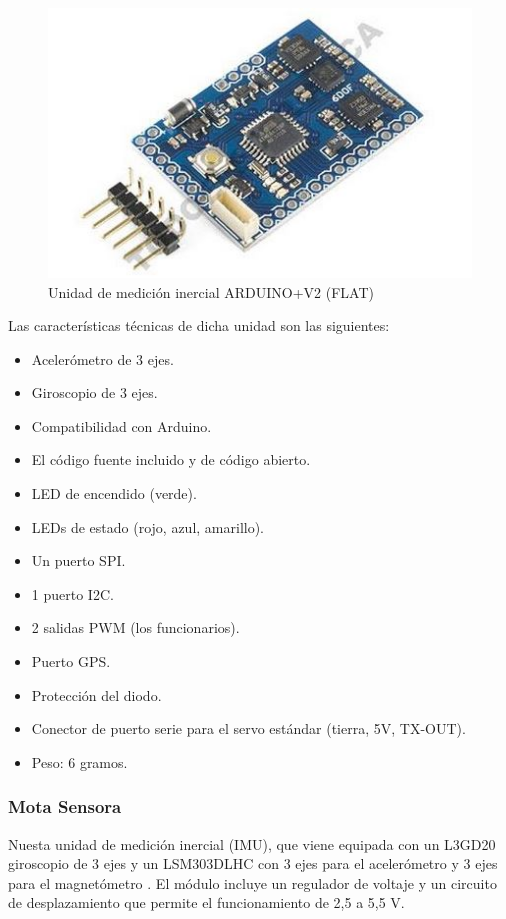 				\begin{figure}[h]
					\centering
					\includegraphics{imagenes/FLAT.JPG}
					\caption{Unidad de medición inercial ARDUINO+V2 (FLAT)}
					\label{contexto:figura}
				\end{figure}
				
				Las características técnicas de dicha unidad son las siguientes:
				
				\begin{itemize}
					\item Acelerómetro de 3 ejes.
					\item Giroscopio de 3 ejes.
					\item Compatibilidad con Arduino.
					\item El código fuente incluido y de código abierto.
					\item LED de encendido (verde).
					\item LEDs de estado (rojo, azul, amarillo).
					\item Un puerto SPI.
					\item 1 puerto I2C.
					\item 2 salidas PWM (los funcionarios).
					\item Puerto GPS.
					\item Protección del diodo.
					\item Conector de puerto serie para el servo estándar (tierra, 5V, TX-OUT).
					\item Peso: 6 gramos.
				\end{itemize}
			
			\subsubsection{Mota Sensora}
				
				Nuesta unidad de medición inercial (IMU), que viene equipada con un L3GD20 giroscopio de 3 ejes y un LSM303DLHC con 3 ejes para el acelerómetro y 3 ejes para el magnetómetro \cite{Pololu}. El módulo incluye un regulador de voltaje y un circuito de desplazamiento que permite el funcionamiento de 2,5 a 5,5 V.
				
